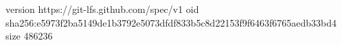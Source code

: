 version https://git-lfs.github.com/spec/v1
oid sha256:e5973f2ba5149de1b3792e5073dfdf833b5c8d22153f9f6463f6765aedb33bd4
size 486236
